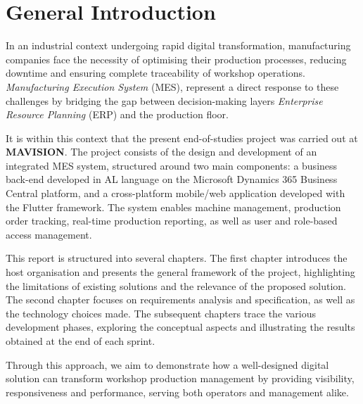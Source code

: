 \documentclass[12pt,a4paper]{report}
\begin{document}
\setcounter{page}{1}

\chapter*{General Introduction}

In an industrial context undergoing rapid digital transformation, manufacturing
companies face the necessity of optimising their production processes, reducing
downtime and ensuring complete traceability of workshop operations.
\textit{Manufacturing Execution System} (MES), represent a direct response to 
these challenges by bridging the gap between decision-making layers 
\textit{Enterprise Resource Planning} (ERP) and  the production floor.

It is within this context that the present end-of-studies project was carried out at
\textbf{MAVISION}. The project consists of the design and development of an integrated
MES system, structured around two main components: a business back-end developed in
AL language on the Microsoft Dynamics 365 Business Central platform, and a
cross-platform mobile/web application developed with the Flutter framework. The system
enables machine management, production order tracking, real-time production reporting,
as well as user and role-based access management.

This report is structured into several chapters. The first chapter introduces the
host organisation and presents the general framework of the project, highlighting the
limitations of existing solutions and the relevance of the proposed solution. The
second chapter focuses on requirements analysis and specification, as well as the
technology choices made. The subsequent chapters trace the various development phases,
exploring the conceptual aspects and illustrating the results obtained at the end of
each sprint.

Through this approach, we aim to demonstrate how a well-designed digital solution can
transform workshop production management by providing visibility, responsiveness and
performance, serving both operators and management alike.


\end{document}
